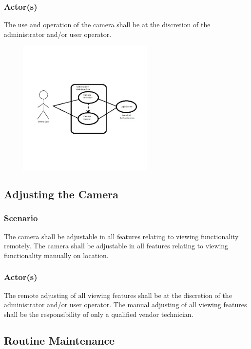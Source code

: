 \subsubsection{Actor(s)}
The use and operation of the camera shall be at the discretion of the administrator and/or user operator.
\vspace{0.5 in}
\begin{figure}[h!]
	\centering
   	\includegraphics[width=0.60\textwidth]{images/camera_operation_UML.jpg}
\end{figure}
\vspace{0.5 in}
\subsection{Adjusting the Camera}

\subsubsection{Scenario}
The camera shall be adjustable in all features relating to viewing functionality remotely.
The camera shall be adjustable in all features relating to viewing functionality manually on location.

\subsubsection{Actor(s)}
The remote adjusting of all viewing features shall be at the discretion of the administrator and/or user operator.
The manual adjusting of all viewing features shall be the responsibility of only a qualified vendor technician.

\subsection{Routine Maintenance}

